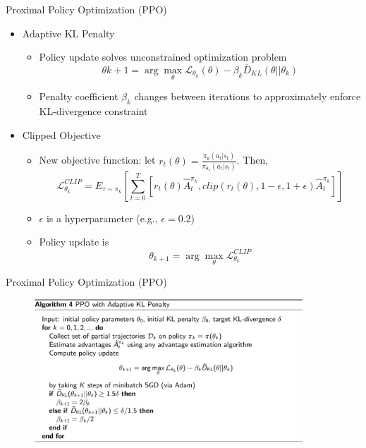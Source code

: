 \begin{frame}{Proximal Policy Optimization (PPO)}
\begin{itemize}
    \item Adaptive KL Penalty
    \begin{itemize}
        \item Policy update solves unconstrained optimization problem
        $$\theta{k+1} = \arg \max_\theta \mathcal{L}_{\theta_k}(\theta) - \beta_k \overline{D}_{KL}(\theta||\theta_k)$$
        \item Penalty coefficient $\beta_k$ changes between iterations to approximately enforce KL-divergence constraint
    \end{itemize}
    \pause
    \item Clipped Objective
    \begin{itemize}
        \item New objective function: let $r_t(\theta) = \frac{\pi_{\theta}(a_t | s_t)}{\pi_{\theta_k}(a_t | s_t)}$. Then,
        $$\mathcal{L}^{CLIP}_{\theta_k} = E_{\tau \sim \pi_k} \left [ \sum^{T}_{t=0} \left [ r_t(\theta)\hat{A}^{\pi_k}_t, clip(r_t(\theta), 1-\epsilon, 1+\epsilon)\hat{A}^{\pi_k}_t \right ] \right ]$$
        \item $\epsilon$ is a hyperparameter (e.g., $\epsilon = 0.2$)
        \item Policy update is 
        $$\theta_{k+1} = \arg \max_\theta \mathcal{L}^{CLIP}_{\theta_k}$$
        
    \end{itemize}

    
\end{itemize}
    
\end{frame}

\begin{frame}{Proximal Policy Optimization (PPO)}
\begin{figure}
\centering
\includegraphics[width=0.9\textwidth,height=0.9\textheight,keepaspectratio]{images/policy-search/ppo_1.png}
\end{figure}
    
\end{frame}

